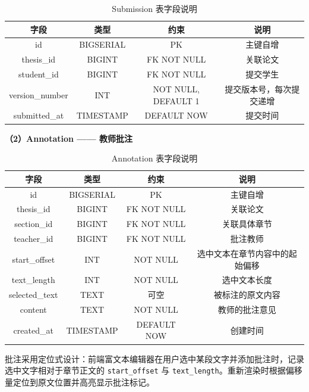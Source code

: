 \documentclass{../softeng}
\begin{document}
\begin{table}[htbp]
\centering
\caption{Submission 表字段说明}
\label{tab:submission-fields}
\begin{tabular}{|c|c|c|c|}
\hline
\textbf{字段} & \textbf{类型} & \textbf{约束} & \textbf{说明} \\
\hline
id & BIGSERIAL & PK & 主键自增 \\
\hline
thesis\_id & BIGINT & FK NOT NULL & 关联论文 \\
\hline
student\_id & BIGINT & FK NOT NULL & 提交学生 \\
\hline
version\_number & INT & NOT NULL, DEFAULT 1 & 提交版本号，每次提交递增 \\
\hline
submitted\_at & TIMESTAMP & DEFAULT NOW & 提交时间 \\
\hline
\end{tabular}
\end{table}

\textbf{（2）Annotation —— 教师批注}

\begin{table}[htbp]
\centering
\caption{Annotation 表字段说明}
\label{tab:annotation-fields}
\begin{tabular}{|c|c|c|c|}
\hline
\textbf{字段} & \textbf{类型} & \textbf{约束} & \textbf{说明} \\
\hline
id & BIGSERIAL & PK & 主键自增 \\
\hline
thesis\_id & BIGINT & FK NOT NULL & 关联论文 \\
\hline
section\_id & BIGINT & FK NOT NULL & 关联具体章节 \\
\hline
teacher\_id & BIGINT & FK NOT NULL & 批注教师 \\
\hline
start\_offset & INT & NOT NULL & 选中文本在章节内容中的起始偏移 \\
\hline
text\_length & INT & NOT NULL & 选中文本长度 \\
\hline
selected\_text & TEXT & 可空 & 被标注的原文内容 \\
\hline
content & TEXT & NOT NULL & 教师的批注意见 \\
\hline
created\_at & TIMESTAMP & DEFAULT NOW & 创建时间 \\
\hline
\end{tabular}
\end{table}

批注采用定位式设计：前端富文本编辑器在用户选中某段文字并添加批注时，记录选中文字相对于章节正文的 \texttt{start\_offset} 与 \texttt{text\_length}。重新渲染时根据偏移量定位到原文位置并高亮显示批注标记。
\end{document}
